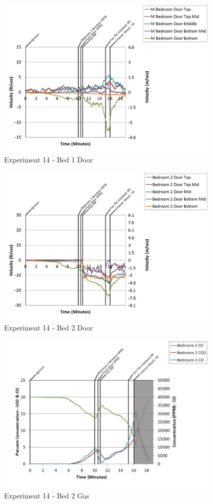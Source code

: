 \documentclass{article}
\begin{document}
\begin{appendices}
	\clearpage

	\begin{figure}[h!]
		\centering
		\includegraphics[height=3.05in]{0_Images/Results_Charts/Exp_14_Charts/Bed1Door.pdf}
		\caption{Experiment 14 - Bed 1 Door}
	\end{figure}
 

	\begin{figure}[h!]
		\centering
		\includegraphics[height=3.05in]{0_Images/Results_Charts/Exp_14_Charts/Bed2Door.pdf}
		\caption{Experiment 14 - Bed 2 Door}
	\end{figure}
 
	\clearpage

	\begin{figure}[h!]
		\centering
		\includegraphics[height=3.05in]{0_Images/Results_Charts/Exp_14_Charts/Bed2Gas.pdf}
		\caption{Experiment 14 - Bed 2 Gas}
	\end{figure}
 


\end{appendices}
\end{document}
